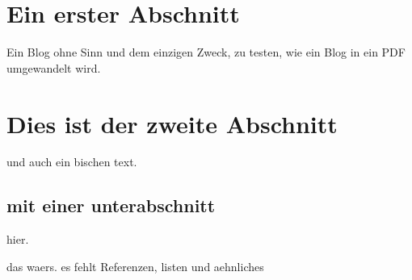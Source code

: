 \documentclass[a4paper,10pt]{scrbook}
\begin{document}
\hypertarget{ein-erster-abschnitt}{%
\section{Ein erster Abschnitt}\label{ein-erster-abschnitt}}

Ein Blog ohne Sinn und dem einzigen Zweck, zu testen, wie ein Blog in
ein PDF umgewandelt wird.

\hypertarget{dies-ist-der-zweite-abschnitt}{%
\section{Dies ist der zweite
Abschnitt}\label{dies-ist-der-zweite-abschnitt}}

und auch ein bischen text.

\hypertarget{mit-einer-unterabschnitt}{%
\subsection{mit einer unterabschnitt}\label{mit-einer-unterabschnitt}}

hier.

das waers. es fehlt Referenzen, listen und aehnliches

\printindex
\end{document}
